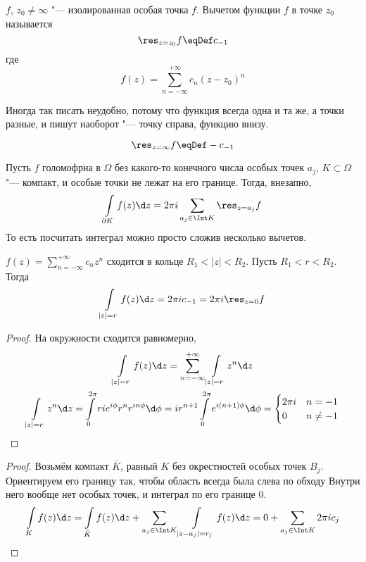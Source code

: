 \begin{Def}
	$f$, $z_0 \ne \infty$ "--- изолированная особая точка $f$.
	Вычетом функции $f$ в точке $z_0$ называется
	\[ \res_{z = z_0} f \eqDef c_{-1} \]
	где
	\[ f(z) = \sum_{n=-\infty}^{+\infty} c_n(z-z_0)^n \]
\end{Def}
Иногда так писать неудобно, потому что функция всегда одна и та же, а точки разные, и пишут наоборот "--- точку справа, функцию внизу.

\begin{Def}
	\[ \res_{z = \infty} f \eqDef -c_{-1}\]
\end{Def}

\begin{theorem}
	Пусть $f$ голомофрна в $\Omega$ без какого-то конечного числа особых точек $a_j$,
	$K \subset \Omega$ "--- компакт, и особые точки не лежат на его границе.
	Тогда, внезапно,
	\[ \int\limits_{\partial K} f(z) \d z = 2\pi i\sum_{a_j \in \Int K} \res_{z=a_j} f \]
	То есть посчитать интеграл можно просто сложив несколько вычетов.
\end{theorem}

\begin{lemma}
	$f(z) = \sum_{n=-\infty}^{+\infty} c_n z^n$ сходится в кольце $R_1 < |z| < R_2$.
	Пусть $R_1 < r < R_2$.
	Тогда
	\[ \int\limits_{|z| = r} f(z) \d z = 2\pi i c_{-1} = 2\pi i\res_{z=0} f \]
\end{lemma}
\begin{proof}
	На окружности сходится равномерно,
	\begin{gather*}
		\int\limits_{|z| = r} f(z)\d z
		= \sum_{n=-\infty}^{+\infty} \int\limits_{|z|=r} z^n \d z \\
		\int\limits_{|z| = r} z^n \d z
		= \int\limits_0^{2\pi} rie^{i\phi}r^nr^{in\phi} \d \phi
		= ir^{n+1} \int\limits_0^{2\pi} e^{i(n+1)\phi} \d \phi
		= \begin{cases} 2\pi i & n = -1 \\ 0 & n \ne -1 \end{cases}
	\end{gather*}
\end{proof}

\begin{proof}
	Возьмём компакт $\bar K$, равный $K$ без окрестностей особых точек $B_j$.
	Ориентируем его границу так, чтобы область всегда была слева по обходу
	Внутри него вообще нет особых точек, и интеграл по его границе 0.
	\begin{gather*}
		\int\limits_K f(z) \d z
		= \int\limits_{\bar K} f(z) \d z + \sum_{a_j \in \Int K} \int\limits_{|z-a_j|=r_j} f(z) \d z
		= 0 + \sum_{a_j \in \Int K} 2\pi ic_j
	\end{gather*}
\end{proof}

